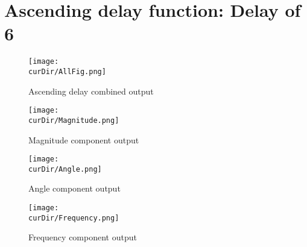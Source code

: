 \newpage
\newcommand{\curDir}{PMUsim-figures/Ascending/DelayOf_6}
\section{Ascending delay function: Delay of 6}
\begin{figure}[hb]
    \texttt{[image: \\curDir/AllFig.png]}    
    \caption{Ascending delay combined output}
    \label{fig:PMUsim-Asc6-allfig}
\end{figure}


     \begin{figure}
        \caption{Magnitude component output}
 
    \texttt{[image: \\curDir/Magnitude.png]}    
         \label{fig:PMUsim-Asc6Mag}
 
\end{figure}

     \begin{figure}
        \caption{Angle component output}
 
   \texttt{[image: \\curDir/Angle.png]}    
         \label{fig:PMUsim-Asc6Ang}
 
\end{figure}

     \begin{figure}
        \caption{Frequency component output}
 
   \texttt{[image: \\curDir/Frequency.png]}    
         \label{fig:PMUsim-Asc6Freq}
 
\end{figure}


